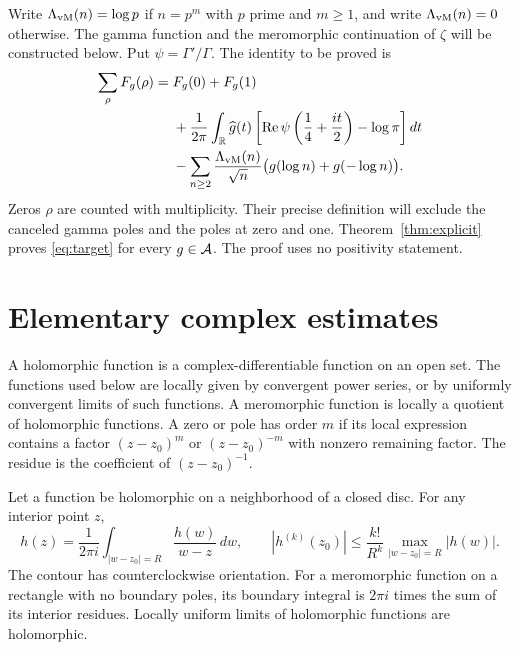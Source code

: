 Write $\Lambda_{\rm vM}(n)=\log p$ if $n=p^m$ with $p$ prime and $m\geq1$,
and write $\Lambda_{\rm vM}(n)=0$ otherwise.
The gamma function and the meromorphic continuation of $\zeta$ will be
constructed below.  Put $\psi=\Gamma'/\Gamma$.
The identity to be proved is
\begin{equation}
\begin{split}
 \sum_\rho F_g(\rho)={}&F_g(0)+F_g(1)\\
 &+\frac1{2\pi}\int_{\mathbb R}\widehat g(t)
 \left[\operatorname{Re}\psi\left(\frac14+\frac{it}{2}\right)-\log\pi\right]dt\\
 &-\sum_{n\geq2}\frac{\Lambda_{\rm vM}(n)}{\sqrt n}
                      \bigl(g(\log n)+g(-\log n)\bigr).
\end{split}
\label{eq:target}
\end{equation}
Zeros $\rho$ are counted with multiplicity.  Their precise definition will
exclude the canceled gamma poles and the poles at zero and one.
Theorem~\ref{thm:explicit} proves \eqref{eq:target} for every $g\in\mathcal A$.
The proof uses no positivity statement.

\section{Elementary complex estimates}
\label{sec:complex}

A holomorphic function is a complex-differentiable function on an open set.
The functions used below are locally given by convergent power series,
or by uniformly convergent limits of such functions.
A meromorphic function is locally a quotient of holomorphic functions.
A zero or pole has order $m$ if its local expression contains a factor
$(z-z_0)^m$ or $(z-z_0)^{-m}$ with nonzero remaining factor.
The residue is the coefficient of $(z-z_0)^{-1}$.

\begin{lemma}
\label{lem:cauchy}
Let a function be holomorphic on a neighborhood of a closed disc.
For any interior point $z$,
\[
 h(z)=\frac1{2\pi i}\int_{|w-z_0|=R}\frac{h(w)}{w-z}\,dw,
 \qquad
 |h^{(k)}(z_0)|\leq \frac{k!}{R^k}\max_{|w-z_0|=R}|h(w)|.
\]
The contour has counterclockwise orientation.
For a meromorphic function on a rectangle with no boundary poles, its
boundary integral is $2\pi i$ times the sum of its interior residues.
Locally uniform limits of holomorphic functions are holomorphic.
\end{lemma}

